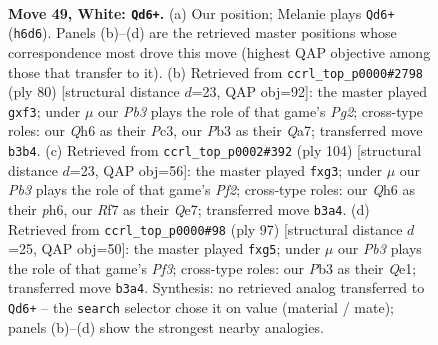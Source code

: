 \documentclass[11pt]{article}
\begin{document}
\clearpage

\begin{figure}[p]\centering
\begin{subfigure}{0.46\textwidth}\centering
\resizebox{\linewidth}{!}{%
\newchessgame
\chessboard[
  setfen={3k4/5R2/7Q/1qp5/p7/1P6/P7/6K1 w - - 7 49},
  showmover=false,
  pgfstyle=straightmove, color=movearrow, markmove={h6-d6}
]}
\caption{}
\end{subfigure}\hfill
\begin{subfigure}{0.46\textwidth}\centering
\resizebox{\linewidth}{!}{%
\newchessgame
\chessboard[
  setfen={8/Q7/p7/6p1/8/P1P2pqP/6P1/k6K w - - 0 41},
  showmover=false,
  pgfstyle=straightmove, color=movearrow, markmove={g2-f3}
]}
\caption{}
\end{subfigure}
\\[4pt]
\begin{subfigure}{0.46\textwidth}\centering
\resizebox{\linewidth}{!}{%
\newchessgame
\chessboard[
  setfen={8/4Q3/7p/5q1k/4p3/4P1p1/5P2/6K1 w - - 0 53},
  showmover=false,
  pgfstyle=straightmove, color=movearrow, markmove={f2-g3}
]}
\caption{}
\end{subfigure}\hfill
\begin{subfigure}{0.46\textwidth}\centering
\resizebox{\linewidth}{!}{%
\newchessgame
\chessboard[
  setfen={8/6k1/2Q2p2/6Pp/P7/6P1/7K/4q3 b - - 0 49},
  showmover=false,
  pgfstyle=straightmove, color=movearrow, markmove={f6-g5}
]}
\caption{}
\end{subfigure}
\caption{\textbf{Move 49, White: \texttt{Qd6+}.} (a) Our position; Melanie plays \texttt{Qd6+} (\texttt{h6d6}). Panels (b)--(d) are the retrieved master positions whose correspondence most drove this move (highest QAP objective among those that transfer to it). (b) Retrieved from \texttt{ccrl\_top\_p0000\#2798} (ply 80) [structural distance $d$=23, QAP obj=92]: the master played \texttt{gxf3}; under $\mu$ our \emph{Pb3} plays the role of that game's \emph{Pg2}; cross-type roles: our \emph{Q}h6 as their \emph{P}c3, our \emph{P}b3 as their \emph{Q}a7; transferred move \texttt{b3b4}. (c) Retrieved from \texttt{ccrl\_top\_p0002\#392} (ply 104) [structural distance $d$=23, QAP obj=56]: the master played \texttt{fxg3}; under $\mu$ our \emph{Pb3} plays the role of that game's \emph{Pf2}; cross-type roles: our \emph{Q}h6 as their \emph{p}h6, our \emph{R}f7 as their \emph{Q}e7; transferred move \texttt{b3a4}. (d) Retrieved from \texttt{ccrl\_top\_p0000\#98} (ply 97) [structural distance $d$=25, QAP obj=50]: the master played \texttt{fxg5}; under $\mu$ our \emph{Pb3} plays the role of that game's \emph{Pf3}; cross-type roles: our \emph{P}b3 as their \emph{Q}e1; transferred move \texttt{b3a4}. Synthesis: no retrieved analog transferred to \texttt{Qd6+} -- the \texttt{search} selector chose it on value (material / mate); panels (b)--(d) show the strongest nearby analogies.}
\label{fig:thought-m96}
\end{figure}
\end{document}
